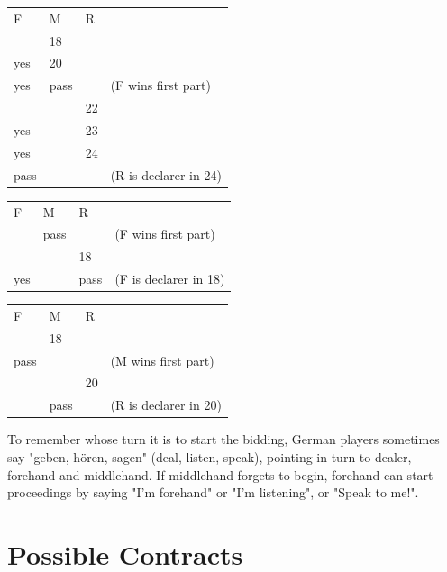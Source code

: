\documentclass[letter]{article}
\begin{document}
  \begin{minipage}[t][5cm]{0.5\textwidth}
    \centering
    \vspace{0pt}
    \begin{tabular}{l l l l}
         F &    M &  R & \\
       \cmidrule(r){1-3}
           &   18 &    & \\
       yes &   20 &    & \\
       yes & pass &    & (F wins first part) \\
           &      & 22 & \\
       yes &      & 23 & \\
       yes &      & 24 & \\
      pass &      &    & (R is declarer in 24) \\
    \end{tabular}
    \vfill
  \end{minipage}
  \begin{minipage}[t][5cm]{0.5\textwidth}
    \centering
    \vspace{0pt}
    \begin{tabular}{l l l l}
        F &    M &  R & \\
       \cmidrule(r){1-3}
          & pass &    & (F wins first part) \\
          &      & 18 & \\
      yes &      & pass & (F is declarer in 18) \\
    \end{tabular}
    \vfill
    \begin{tabular}{l l l l}
         F &    M &  R & \\
       \cmidrule(r){1-3}
           &   18 &    & \\
      pass &      &    & (M wins first part) \\
           &      & 20 & \\
           & pass &    & (R is declarer in 20) \\
    \end{tabular}
  \end{minipage}

  To remember whose turn it is to start the bidding, German players sometimes
  say "geben, hören, sagen" (deal, listen, speak), pointing in turn to dealer,
  forehand and middlehand. If middlehand forgets to begin, forehand can start
  proceedings by saying "I'm forehand" or "I'm listening", or "Speak to me!".

  \section*{Possible Contracts}
\end{document}
